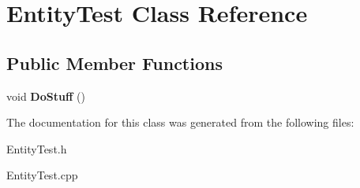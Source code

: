 \hypertarget{class_entity_test}{}\section{Entity\+Test Class Reference}
\label{class_entity_test}
\subsection*{Public Member Functions}
\begin{DoxyCompactItemize}
\item 
\hypertarget{class_entity_test_a498a232716491b321a68f2a01caeb8da}{}void {\bfseries Do\+Stuff} ()\label{class_entity_test_a498a232716491b321a68f2a01caeb8da}

\end{DoxyCompactItemize}


The documentation for this class was generated from the following files\+:\begin{DoxyCompactItemize}
\item 
Entity\+Test.\+h\item 
Entity\+Test.\+cpp\end{DoxyCompactItemize}
